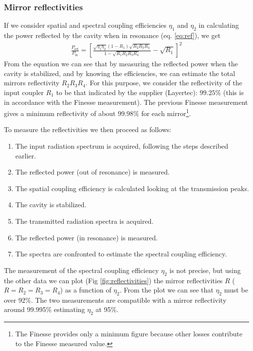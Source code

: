 \subsubsection{Mirror reflectivities}

If we consider spatial and spectral coupling efficiencies $\eta_1$ and $\eta_2$ in calculating the power reflected by the cavity when in resonance (eq. \ref{eq:ref}), we get
\begin{align}
\frac{P_\mathrm{ref}}{P_\mathrm{in}} = \left[ \frac{\sqrt{\eta_1\eta_2}(1-R_1)\sqrt{R_2R_3R_4}}{1-\sqrt{R_1R_2R_3R_4}}-\sqrt{R_1}  \right]^2
\end{align}
From the equation we can see that by measuring the reflected power when the cavity is stabilized, and by knowing the efficiencies, we can estimate the total mirrors reflectivity $R_2R_3R_4$. For this purpose, we consider the reflectivity of the input coupler $R_1$ to be that indicated by the supplier (Layertec): $99.25\%$ (this is in accordance with the Finesse measurement). The previous Finesse measurement gives a minimum reflectivity of about 99.98\% for each mirror\footnote{The Finesse provides only a minimum figure because other losses contribute to the Finesse measured value.}.

To measure the reflectivities we then proceed as follows:
\begin{enumerate}
	\item The input radiation spectrum is acquired, following the steps described earlier.
	\item The reflected power (out of resonance) is measured.
	\item The spatial coupling efficiency is calculated looking at the transmission peaks.
	\item The cavity is stabilized.
	\item The transmitted radiation spectra is acquired.
	\item The reflected power (in resonance) is measured.
	\item The spectra are confronted to estimate the spectral coupling efficiency.
\end{enumerate}

The measurement of the spectral coupling efficiency $\eta_2$ is not precise, but using the other data we can plot (Fig \ref{fig:reflectivities}) the mirror reflectivities $R$ ($R=R_2=R_3=R_4$) as a function of $\eta_2$. From the plot we can see that $\eta_2$ must be over 92\%. The two measurements are compatible with a mirror reflectivity around 99.995\% estimating $\eta_2$ at 95\%.

